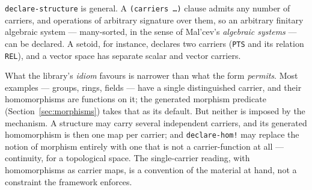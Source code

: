 \begin{remark}
\texttt{declare-structure} is general.  A \texttt{(carriers \ldots)} clause
admits any number of carriers, and operations of arbitrary signature over them,
so an arbitrary finitary algebraic system --- many-sorted, in the sense of
Mal'cev's \emph{algebraic systems} --- can be declared.  A setoid, for instance,
declares two carriers (\texttt{PTS} and its relation \texttt{REL}), and a vector
space has separate scalar and vector carriers.

What the library's \emph{idiom} favours is narrower than what the form
\emph{permits}.  Most examples --- groups, rings, fields --- have a single
distinguished carrier, and their homomorphisms are functions on it; the generated
morphism predicate (Section~\ref{sec:morphisms}) takes that as its default.  But
neither is imposed by the mechanism.  A structure may carry several independent
carriers, and its generated homomorphism is then one map per carrier; and
\texttt{declare-hom!} may replace the notion of morphism entirely with one that is
not a carrier-function at all --- continuity, for a topological space.  The
single-carrier reading, with homomorphisms as carrier maps, is a convention of the
material at hand, not a constraint the framework enforces.
\end{remark}

